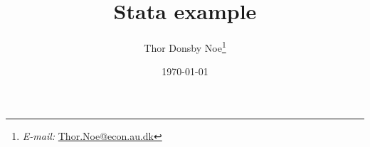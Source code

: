 \usepackage{titling} %

\usepackage{authblk} %


\title{Stata example}

\author{Thor Donsby Noe\thanks{
  \textit{E-mail:} \href{mailto:Thor.Noe@econ.au.dk}{Thor.Noe@econ.au.dk}}
}

\date{\today} %